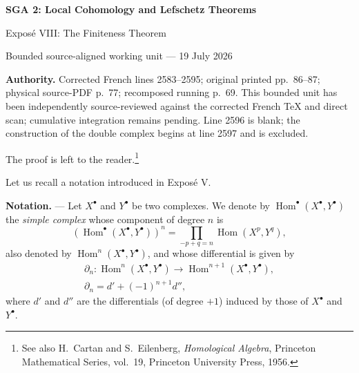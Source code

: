 \documentclass[10pt,a4paper]{article}
\begin{document}
\begin{center}
  {\Large\bfseries SGA 2: Local Cohomology and Lefschetz Theorems}\par\smallskip
  {\large Expos\'e VIII: The Finiteness Theorem}\par
  \small Bounded source-aligned working unit --- 19 July 2026
\end{center}
\noindent\colorbox{softgray}{\parbox{0.95\linewidth}{\footnotesize\textbf{Authority.}
Corrected French lines 2583--2595; original printed pp.~86--87; physical
source-PDF p.~77; recomposed running p.~69. This bounded unit has been
independently source-reviewed against the corrected French TeX and direct scan;
cumulative integration remains pending. Line 2596 is blank; the construction
of the double complex begins at line 2597 and is excluded.}}

The proof is left to the reader.\footnote{See also H.~Cartan and
S.~Eilenberg, \emph{Homological Algebra}, Princeton Mathematical Series,
vol.~19, Princeton University Press, 1956.}

Let us recall a notation introduced in Expos\'e V.

\medskip
\noindent\textbf{Notation.} --- Let $X^\bullet$ and $Y^\bullet$ be two
complexes. We denote by $\operatorname{Hom}^\bullet(X^\bullet,Y^\bullet)$ the
\emph{simple complex} whose component of degree $n$ is
\[
  (\operatorname{Hom}^\bullet(X^\bullet,Y^\bullet))^n
  =\prod_{-p+q=n}\operatorname{Hom}(X^p,Y^q),
\]
also denoted by $\operatorname{Hom}^n(X^\bullet,Y^\bullet)$, and whose
differential is given by
\begin{gather*}
  \partial_n\colon
  \operatorname{Hom}^n(X^\bullet,Y^\bullet)
  \longrightarrow
  \operatorname{Hom}^{n+1}(X^\bullet,Y^\bullet),\\
  \partial_n=d'+(-1)^{n+1}d'',
\end{gather*}
where $d'$ and $d''$ are the differentials (of degree $+1$) induced by those
of $X^\bullet$ and $Y^\bullet$.
\end{document}
